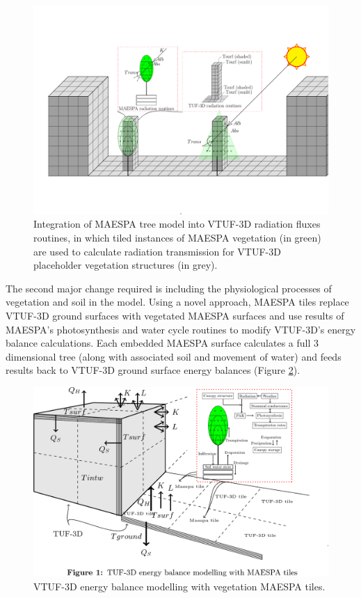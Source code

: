 \documentclass[preprint,12pt,authoryear]{elsarticle}
\begin{document}
\begin{figure}[!htbp]
 \includegraphics[trim = 15mm 41mm 0mm 31mm, clip, scale=0.45]{images/TUFWithMaespaVegRadiation.pdf}  
 \caption{Integration of MAESPA tree model into VTUF-3D radiation fluxes routines, in which tiled instances of MAESPA vegetation (in green) are used to calculate radiation transmission for VTUF-3D placeholder vegetation structures (in grey)\label{fig:TUFWithMaespaVegRadiation}.}
\end{figure}

The second major change required is including the physiological processes of vegetation and soil in the model. Using a novel approach, MAESPA tiles replace VTUF-3D ground surfaces with vegetated MAESPA surfaces and use results of MAESPA's photosynthesis and water cycle routines to modify VTUF-3D's energy balance calculations. Each embedded MAESPA surface calculates a full 3 dimensional tree (along with associated soil and movement of water) and feeds results back to VTUF-3D ground surface energy balances (Figure \ref{fig:TUFWithMaespaInsert}). 

\begin{figure}[!htbp]
 \includegraphics[trim = 0mm 14mm 22mm 0.0mm, clip, scale=0.25]{images/TUFWithMaespaInsert.png}
 \caption{VTUF-3D energy balance modelling with vegetation MAESPA tiles\label{fig:TUFWithMaespaInsert}.}
\end{figure}
\end{document}
